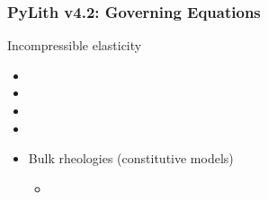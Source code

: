 \documentclass[aspectratio=169]{beamer}
\begin{document}
\begin{frame}
  \frametitle{PyLith v4.2: Governing Equations}
  \summary{}

  Incompressible elasticity
  \begin{itemize}
  \item {}
  \item {}
  \item {}
  \item {}
  \item Bulk rheologies (constitutive models)
    \begin{itemize}
    \item {}
    \end{itemize}
  \end{itemize}

  \vfill%
  \hfill%
  \begin{minipage}{0.25\textwidth}
    \\
    \\
  \end{minipage}  

\end{frame}
\end{document}
